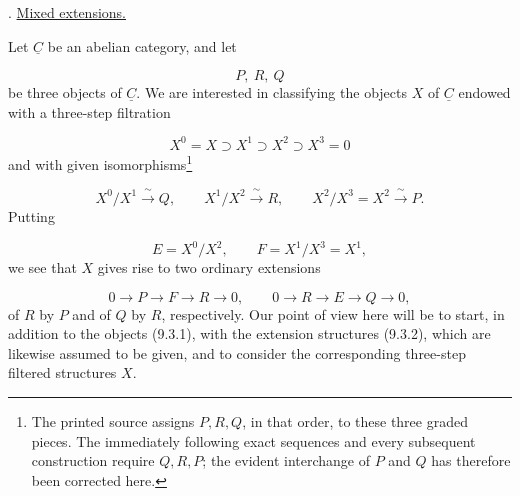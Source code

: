 
\medskip
{}. \underline{Mixed extensions.}

Let $\underline C$ be an abelian category, and let

\begin{equation}\tag{9.3.1}
P,\ R,\ Q
\end{equation}
be three objects of $\underline C$. We are interested in classifying the
objects $X$ of $\underline C$ endowed with a three-step filtration

\begin{equation}\tag{*}
X^0=X\supset X^1\supset X^2\supset X^3=0
\end{equation}
and with given isomorphisms\footnote{The printed source assigns $P,R,Q$,
in that order, to these three graded pieces.  The immediately following exact
sequences and every subsequent construction require $Q,R,P$; the evident
interchange of $P$ and $Q$ has therefore been corrected here.}

\begin{equation*}
X^0/X^1\xrightarrow{\ \sim\ }Q,
\qquad X^1/X^2\xrightarrow{\ \sim\ }R,
\qquad X^2/X^3=X^2\xrightarrow{\ \sim\ }P.
\end{equation*}
Putting

\begin{equation*}
E=X^0/X^2,
\qquad F=X^1/X^3=X^1,
\end{equation*}
we see that $X$ gives rise to two ordinary extensions

\begin{equation}\tag{9.3.2}
0\longrightarrow P\longrightarrow F\longrightarrow R\longrightarrow0,
\qquad
0\longrightarrow R\longrightarrow E\longrightarrow Q\longrightarrow0,
\end{equation}
of $R$ by $P$ and of $Q$ by $R$, respectively. Our point of view here will
be to start, in addition to the objects (9.3.1), with the extension
structures (9.3.2), which are likewise assumed to be given, and to consider
the corresponding three-step filtered structures $X$.

